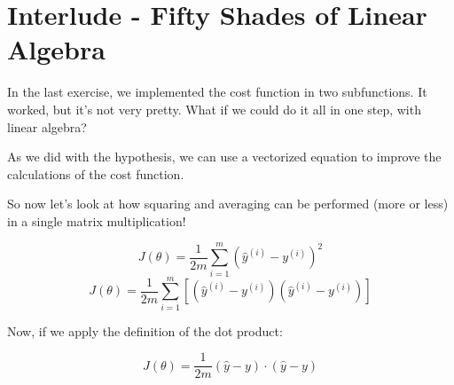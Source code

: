 
\section*{Interlude - Fifty Shades of Linear Algebra}

In the last exercise, we implemented the cost function in two subfunctions.
It worked, but it's not very pretty.
What if we could do it all in one step, with linear algebra?   

As we did with the hypothesis, we can use a vectorized equation to improve the calculations of the cost function.

So now let's look at how squaring and averaging can be performed (more or less) in a single matrix multiplication!

$$
J(\theta) = \frac{1}{2m}\sum_{i=1}^{m}(\hat{y}^{(i)} - y^{(i)})^2
$$
$$
J(\theta) = \frac{1}{2m}\sum_{i=1}^{m}[(\hat{y}^{(i)} - y^{(i)}) (\hat{y}^{(i)} - y^{(i)})]
$$

Now, if we apply the definition of the dot product:

$$
J(\theta) = \frac{1}{2m}(\hat{y} - y) \cdot(\hat{y}- y)
$$